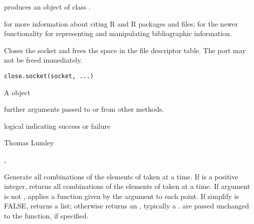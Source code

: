 %
\begin{Value}
 produces an object of class .
\end{Value}
%
\begin{SeeAlso}\relax
{} for more information about citing R and R
packages and  files;
 for the newer functionality for representing
and manipulating bibliographic information.
\end{SeeAlso}
%
\begin{Description}\relax
Closes the socket and frees the space in the file descriptor table.  The
port may not be freed immediately.
\end{Description}
%
\begin{Usage}
\begin{verbatim}
close.socket(socket, ...)
\end{verbatim}
\end{Usage}
%
\begin{Arguments}
\begin{ldescription}
\item[\code{socket}] A  object
\item[\code{...}] further arguments passed to or from other methods.
\end{ldescription}
\end{Arguments}
%
\begin{Value}
logical indicating success or failure
\end{Value}
%
\begin{Author}\relax
Thomas Lumley
\end{Author}
%
\begin{SeeAlso}\relax
{}, 
\end{SeeAlso}
%
\begin{Description}\relax
Generate all combinations of the elements of  taken 
at a time.  If  is a positive integer, returns all
combinations of the elements of  taken  at a
time.  If argument  is not , applies a function given
by the argument to each point.  If simplify is FALSE,  returns
a list; otherwise returns an , typically a
.   are passed unchanged to the
 function, if specified.
\end{Description}
